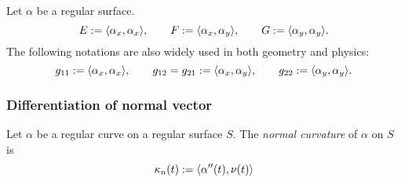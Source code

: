\documentclass{../exp}
\def\a{\alpha}
\begin{document}
\begin{defn}
Let $\a$ be a regular surface.
\[E:=\<\a_x,\a_x\>,\qquad F:=\<\a_x,\a_y\>,\qquad G:=\<\a_y,\a_y\>.\]
The following notations are also widely used in both geometry and physics:
\[g_{11}:=\<\a_x,\a_x\>,\qquad g_{12}=g_{21}:=\<\a_x,\a_y\>,\qquad g_{22}:=\<\a_y,\a_y\>.\]
\end{defn}


\subsubsection{Differentiation of normal vector}
\begin{defn}
Let $\a$ be a regular curve on a regular surface $S$.
The \emph{normal curvature} of $\a$ on $S$ is
\[\kappa_n(t):=\<\a''(t),\nu(t)\>\]
\end{defn}

\end{document}
